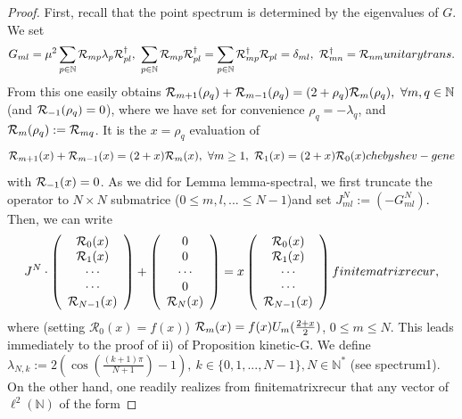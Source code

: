 \documentclass[10pt]{book}
\theoremstyle{break}
\begin{document}
\begin{proof}
First, recall that the point spectrum is determined by the eigenvalues of $G$. We set 
\begin{equation*}
G_{ml}=\mu^2\sum_{p\in\mathbb{N}}{\cal{R}}_{mp}\lambda_p{\cal{R}}^\dag_{pl},\ \sum_{p\in\mathbb{N}}{\cal{R}}_{mp}{\cal{R}}^\dag_{pl}=\sum_{p\in\mathbb{N}}{\cal{R}}^\dag_{mp}{\cal{R}}_{pl}=\delta_{ml},\ {\cal{R}}^\dag_{mn}={\cal{R}}_{nm}{unitarytrans}.
\end{equation*}
From this one easily obtains ${\cal{R}}_{m+1}(\rho_q)+{\cal{R}}_{m-1}(\rho_q)=(2+\rho_q){\cal{R}}_{m}(\rho_q),\ \forall m,q\in\mathbb{N}$ (and ${\cal{R}}_{-1}(\rho_q)=0$), where we have set for convenience $\rho_q=-\lambda_q$, and ${\cal{R}}_{m}(\rho_q):={\cal{R}}_{mq}$. It is the $x=\rho_q$ evaluation of
\begin{equation*}
{\cal{R}}_{m+1}(x)+{\cal{R}}_{m-1}(x)=(2+x){\cal{R}}_{m}(x),\ \forall m\ge1,\ {\cal{R}}_1(x)=(2+x){\cal{R}}_0(x) {chebyshev-gene}
\end{equation*}
with ${\cal{R}}_{-1}(x)=0$. As we did for Lemma {lemma-spectral}, we first truncate the operator to $N\times N$ submatrice ($0\le m,l,...\le N-1$)and set $J^N_{ml}:=(-G^N_{ml})$. Then, we can write 
\begin{equation*}
J^N\cdot \left(\begin{array}{c}
\mathcal{R}_0(x)\\
\mathcal{R}_1(x)\\ 
\cdots \\
\cdots \\
\mathcal{R}_{N-1}(x)
  \end{array}  \right) + \left(\begin{array}{c}
 0\\
0\\
\cdots \\ 
0 \\
{\cal{R}}_N(x)
  \end{array}  \right)=x\left(\begin{array}{c}
\mathcal{R}_0(x)\\
\mathcal{R}_1(x)\\ 
\cdots \\
\cdots \\
\mathcal{R}_{N-1}(x)
  \end{array}  \right){finitematrixrecur},
\end{equation*}
where (setting $\mathcal{R}_0(x)=f(x)$) ${\cal{R}}_m(x)=f(x)U_m({\frac{2+x}{2}})$, $0\le m\le N$. This leads immediately to the proof of ii) of Proposition {kinetic-G}. We define $\lambda_{N,k}:=2\left(\cos({\frac{(k+1)\pi}{N+1}})-1\right), \ k\in\{0,1,...,N-1\}, N\in\mathbb{N}^*$ (see {spectrum1}). On the other hand, one readily realizes from {finitematrixrecur} that any vector of $\ell^2(\mathbb{N})$ of the form 

\end{proof}
\end{document}
